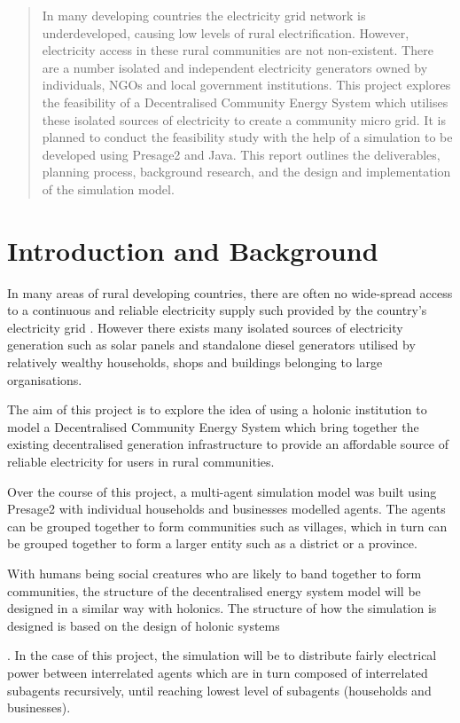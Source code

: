 \documentclass{article}
\begin{document}
\clearpage  %
\begin{abstract}
In many developing countries the electricity grid network is underdeveloped, causing low levels of rural electrification. However, electricity access in these rural communities are not non-existent. There are a number isolated and independent electricity generators owned by individuals, NGOs and local government institutions. This project explores the feasibility of a Decentralised Community Energy System which utilises these isolated sources of electricity to create a community micro grid. It is planned to conduct the feasibility study with the help of a simulation to be developed using Presage2 and Java. This report outlines the deliverables, planning process, background research, and the design and implementation of the simulation model. 

\end{abstract}
\clearpage

\tableofcontents
\clearpage

\section{Introduction and Background}
In many areas of rural developing countries, there are often no wide-spread access to a continuous and reliable electricity supply such provided by the country's electricity grid \cite{IEA-web:2015}. However there exists many isolated sources of electricity generation such as solar panels and standalone diesel generators utilised by relatively wealthy households, shops and buildings belonging to large organisations. 

The aim of this project is to explore the idea of using a holonic institution to model a Decentralised Community Energy System which bring together the existing decentralised generation infrastructure to provide an affordable source of reliable electricity for users in rural communities. 

Over the course of this project, a multi-agent simulation model was built using Presage2 with individual households and businesses modelled agents. The agents can be grouped together to form communities such as villages, which in turn can be grouped together to form a larger entity such as a district or a province. 

With humans being social creatures who are likely to band together to form communities, the structure of the decentralised energy system model will be designed in a similar way with holonics. The structure of how the simulation is designed is based on the design of holonic systems . In the case of this project, the simulation will be to distribute fairly electrical power between interrelated agents which are in turn composed of interrelated subagents recursively, until reaching lowest level of subagents (households and businesses). 
\end{document}

